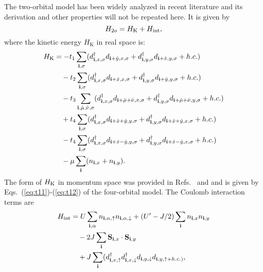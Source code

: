 \documentclass[aps,prb,superscriptaddress,preprintnumbers,
showpacs,legalpaper,twoside,twocolumn,amsmath,amssymb]{revtex4}
\begin{document}
The two-orbital model has been widely analyzed in recent literature
and its derivation and
other properties will not be repeated here. It is given by
\begin{equation}
H_{2o}=H_{\rm K}+H_{\rm int},
\label{1}
\end{equation}
where the kinetic energy $H_\textrm{K}$
in real space is:\cite{daghofer,scalapino}
\begin{equation}\begin{split}
H_{\rm K}&=-t_1\sum_{{\bf i},\sigma}(d^{\dagger}_{{\bf i},x,\sigma}
d_{{\bf i}+\hat y,x,\sigma}+d^{\dagger}_{{\bf i},y,\sigma}
d_{{\bf i}+\hat x,y,\sigma}+h.c.)\\
&\quad -t_2\sum_{{\bf i},\sigma}(d^{\dagger}_{{\bf i},x,\sigma}
d_{{\bf i}+\hat x,x,\sigma}+d^{\dagger}_{{\bf i},y,\sigma}
d_{{\bf i}+\hat y,y,\sigma}+h.c.)\\
&\quad
-t_3\sum_{{\bf i},\hat\mu,\hat\nu,\sigma}(d^{\dagger}_{{\bf i},x,\sigma}
d_{{\bf i}+\hat\mu+\hat\nu,x,\sigma}+d^{\dagger}_{{\bf i},y,\sigma}
d_{{\bf i}+\hat\mu+\hat\nu,y,\sigma}+h.c.)\\
&\quad+t_4\sum_{{\bf i},\sigma}(d^{\dagger}_{{\bf i},x,\sigma}
d_{{\bf i}+\hat x+\hat y,y,\sigma}+d^{\dagger}_{{\bf i},y,\sigma}
d_{{\bf i}+\hat x+\hat y,x,\sigma}+h.c.)\\
&\quad-t_4\sum_{{\bf i},\sigma}(d^{\dagger}_{{\bf i},x,\sigma}
d_{{\bf i}+\hat x-\hat y,y,\sigma}+d^{\dagger}_{{\bf i},y,\sigma}
d_{{\bf i}+\hat x-\hat y,x,\sigma}+h.c.)\\
&\quad-\mu\sum_{\bf i}(n_{{\bf i},x}+n_{{\bf i},y}).
\end{split}\end{equation}
%
The form of $H_{\rm K}$ in momentum space was provided in
Refs.~ and  and is given by
Eqs.~(\ref{eq:t11})-(\ref{eq:t12}) of the four-orbital model.
The Coulomb interaction terms are
\begin{equation}\label{eq:Hint2}\begin{split}
H_{\rm int}&=
U\sum_{{\bf i},\alpha}n_{{\bf i},\alpha,\uparrow}n_{{\bf i},
\alpha,\downarrow}
+(U'-J/2)\sum_{{\bf i}}n_{{\bf i},x}n_{{\bf i},y}\\
&\quad-2J\sum_{\bf i}{\bf S}_{{\bf i},x}\cdot{\bf S}_{{\bf i},y}\\
&\quad+J\sum_{{\bf i}}(d^{\dagger}_{{\bf i},x,\uparrow}
d^{\dagger}_{{\bf i},x,\downarrow}d_{{\bf i},y,\downarrow}
d_{{\bf i},y,\uparrow+h.c.)},
\end{split}\end{equation}
\end{document}
